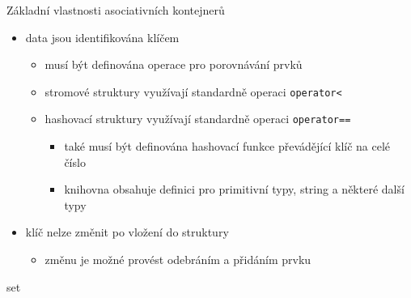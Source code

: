 \begin{frame}[fragile]
\begin{block}{Základní vlastnosti asociativních kontejnerů}
\begin{itemize}
\item data jsou identifikována klíčem
\begin{itemize}
\item musí být definována operace pro porovnávání prvků
\item stromové struktury využívají standardně operaci \lstinline|operator<|
\item hashovací struktury využívají standardně operaci \lstinline|operator==|
\begin{itemize}
\item také musí být definována hashovací funkce převádějící klíč na celé číslo
\item knihovna obsahuje definici pro primitivní typy, string a některé další typy
\end{itemize}

\end{itemize}
\item klíč nelze změnit po vložení do struktury
\begin{itemize}
\item změnu je možné provést odebráním a přidáním prvku
\end{itemize}
\end{itemize}
\end{block}
\end{frame}



\begin{frame}[fragile]
\begin{block}{set}
\end{block}
\end{frame}


